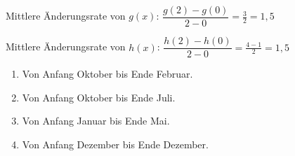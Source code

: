 Mittlere Änderungsrate von \(g(x)\): \(\dfrac{g(2)-g(0)}{2-0}=\frac{3}{2}=1,5\)

Mittlere Änderungsrate von \(h(x)\): \(\dfrac{h(2)-h(0)}{2-0}=\frac{4-1}{2}=1,5\)
\newpage
\begin{Exercise}[title={Bestimme die durchschnittliche Änderungsrate des DAX für folgende Zeiträume jeweils pro Monat.}, label=aenderungsrateA1]

    \begin{minipage}{\textwidth}
		\begin{enumerate}[label=\alph*)]
			\item Von Anfang Oktober bis Ende Februar.
			\item Von Anfang Oktober bis Ende Juli.
			\item Von Anfang Januar bis Ende Mai.
			\item Von Anfang Dezember bis Ende Dezember.
		\end{enumerate}%
    \end{minipage}%
\end{Exercise}

